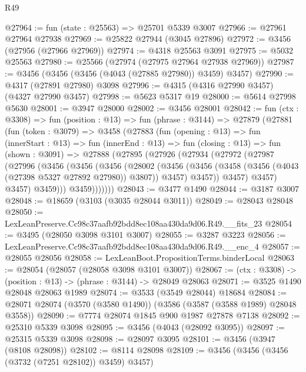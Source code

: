 \begin{lexlean}{R49}
\begin{coremodule}
@27964 := fun (state : @25563) => @25701 @5339 @3007
@27966 := @27961 @27964 @27938
@27969 := @25822 @27944 (@3045 @27896)
@27972 := @3456 (@27956 (@27966 @27969))
@27974 := @4318 @25563 @3091
@27975 := @5032 @25563
@27980 := @25566 (@27974 (@27975 @27964 @27938 @27969))
@27987 := @3456 (@3456 (@3456 (@4043 (@27885 @27980)) @3459) @3457)
@27990 := @4317 (@27891 @27980) @3098
@27996 := @4315 (@4316 @27990 @3457) (@4327 @27990 @3457)
@27998 := @5623 @5317 @19
@28000 := @5614 @27998 @5630
@28001 := @3947 @28000
@28002 := @3456 @28001
@28042 := fun (ctx : @3308) =>
  fun (position : @13) =>
  fun (phrase : @3144) =>
  @27879
    (@27881
      (fun (token : @3079) =>
      @3458
        (@27883
          (fun (opening : @13) =>
          fun (innerStart : @13) =>
          fun (innerEnd : @13) =>
          fun (closing : @13) =>
          fun (shown : @3091) =>
          @27888
            (@27895
              (@27926
                (@27934
                  (@27972
                    (@27987
                      (@27996
                        (@3456
                          (@3456
                            (@3456
                              (@28002
                                (@3456
                                  (@3456
                                    (@3458 (@3456 (@4043 (@27398 @5327 @27892 @27980)) @3807))
                                    @3457)
                                  @3457))
                              @3457)
                            @3457)
                          @3457)
                        @3459)))
                  @3459)))))))
@28043 := @3477 @1490
@28044 := @3187 @3007
@28048 := @18659 (@3103 (@3035 @28044 @3011))
@28049 := @28043 @28048
@28050 := LexLeanPreserve.Cc98c37aafb92bdd8ec108aa430da9d06.R49.__fits_23
@28054 := @3495 (@28050 @3098 @3101 @3007)
@28055 := @3287 @3223
@28056 := LexLeanPreserve.Cc98c37aafb92bdd8ec108aa430da9d06.R49.__enc_4
@28057 := @28055 @28056
@28058 := LexLeanBoot.PropositionTerms.binderLocal
@28063 := @28054 (@28057 (@28058 @3098 @3101 @3007))
@28067 := (ctx : @3308) -> (position : @13) -> (phrase : @3144) -> @28049 @28063
@28071 := @3525 @1490 @28048 @28063 @1989
@28074 := @3533 (@3549 @28044) @18684
@28084 := @28071 @28074 (@3570 (@3580 @1490)) (@3586 (@3587 (@3588 @1989) @28048 @3558))
@28090 := @7774 @28074 @1845 @900 @1987 @27878 @7138
@28092 := @25310 @5339 @3098
@28095 := @3456 (@4043 (@28092 @3095))
@28097 := @25315 @5339 @3098
@28098 := @28097 @3095
@28101 := @3456 (@3947 (@8108 @28098))
@28102 := @8114 @28098
@28109 := @3456 (@3456 (@3456 (@3732 (@7251 @28102)) @3459) @3457)

\end{coremodule}
\end{lexlean}
